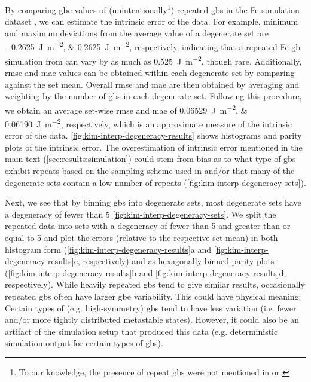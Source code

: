 \documentclass[preprint,12pt]{elsarticle}
\begin{document}
By comparing \gls{gbe} values of (unintentionally\footnote{To our knowledge, the presence of repeat \glspl{gb} were not mentioned in \cite{kimPhasefieldModeling3D2014} or \cite{kimIdentificationSchemeGrain2011}}) repeated \glspl{gb} in the Fe simulation dataset \cite{kimPhasefieldModeling3D2014}, we can estimate the intrinsic error of the \inpt{} data. For example, minimum and maximum deviations from the average value of a degenerate set are \SIlist{-0.2625;0.2625}{\joule\per\square\meter}, respectively, indicating that a repeated Fe \gls{gb} simulation from \cite{kimPhasefieldModeling3D2014} can vary by as much as \SI{0.525}{\joule\per\square\meter}, though rare. Additionally, \Gls{rmse} and \gls{mae} values can be obtained within each degenerate set by comparing against the set mean. Overall \gls{rmse} and \gls{mae} are then obtained by averaging and weighting by the number of \glspl{gb} in each degenerate set. Following this procedure, we obtain an average set-wise \gls{rmse} and \gls{mae} of \SIlist{0.06529;0.06190}{\joule\per\square\meter}, respectively, which is an approximate measure of the intrinsic error of the data. \cref{fig:kim-interp-degeneracy-results} shows histograms and parity plots of the intrinsic error. The overestimation of intrinsic error mentioned in the main text (\cref{sec:results:simulation}) could stem from bias as to what type of \glspl{gb} exhibit repeats based on the sampling scheme used in \cite{kimPhasefieldModeling3D2014} and/or that many of the degenerate sets contain a low number of repeats (\cref{fig:kim-interp-degeneracy-sets}).

Next, we see that by binning \glspl{gb} into degenerate sets, most degenerate sets have a degeneracy of fewer than 5 \cref{fig:kim-interp-degeneracy-sets}. We split the repeated data into sets with a degeneracy of fewer than 5 and greater than or equal to 5 and plot the errors (relative to the respective set mean) in both histogram form (\cref{fig:kim-interp-degeneracy-results}a and \cref{fig:kim-interp-degeneracy-results}c, respectively) and as hexagonally-binned parity plots (\cref{fig:kim-interp-degeneracy-results}b and \cref{fig:kim-interp-degeneracy-results}d, respectively). While heavily repeated \glspl{gb} tend to give similar results, occasionally repeated \glspl{gb} often have larger \gls{gbe} variability. This could have physical meaning: Certain types of (e.g. high-symmetry) \glspl{gb} tend to have less variation (i.e. fewer and/or more tightly distributed metastable states). However, it could also be an artifact of the simulation setup that produced this data (e.g. deterministic simulation output for certain types of \glspl{gb}).
\end{document}
